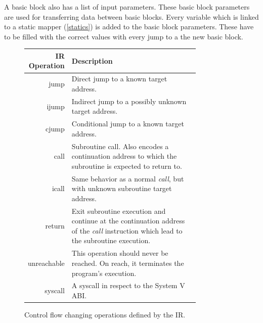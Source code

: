 \documentclass[course=eragp]{aspdoc}
\begin{document}
\par

A basic block also has a list of input parameters. These basic block parameters are used for
transferring data between basic blocks. Every variable which is linked to a static mapper (\ref{statics}) is
added to the basic block parameters. These have to be filled with the correct values with every jump to
a the new basic block.

\begin{figure}
    \begin{center}
        \def\arraystretch{1.5}
        \begin{tabular}{r | p{0.8\linewidth}}
            \hline
            IR Operation & Description                                                                   \\ [0.5ex]
            \hline
            jump         & Direct jump to a known target address.                                        \\
            ijump        & Indirect jump to a possibly unknown target address.                           \\
            cjump        & Conditional jump to a known target address.                                   \\
            call         & Subroutine call. Also encodes a continuation address to which the subroutine
            is expected to return to.                                                                    \\
            icall        & Same behavior as a normal \textit{call}, but with unknown subroutine target
            address.                                                                                     \\
            return       & Exit subroutine execution and continue at the continuation address of the
            \textit{call} instruction which lead to the subroutine execution.                            \\
            unreachable  & This operation should never be reached. On reach, it terminates the program's
            execution.                                                                                   \\
            syscall      & A syscall in respect to the System V ABI.                                     \\
            \hline
        \end{tabular}
        \caption{Control flow changing operations defined by the IR.}\label{figure:cfops}
    \end{center}
\end{figure}
\end{document}

